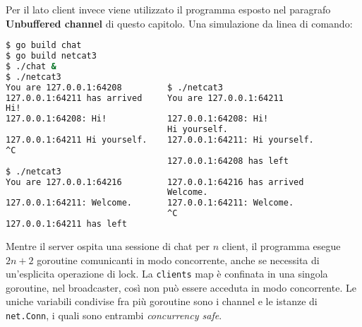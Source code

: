 Per il lato client invece viene utilizzato il programma esposto nel paragrafo \textbf{Unbuffered channel} di questo capitolo.
Una simulazione da linea di comando:
\begin{lstlisting}[language=bash, frame=L, label={lst:lstlisting7-10.4}]
$ go build chat
$ go build netcat3
$ ./chat &
$ ./netcat3
You are 127.0.0.1:64208         $ ./netcat3
127.0.0.1:64211 has arrived     You are 127.0.0.1:64211
Hi!
127.0.0.1:64208: Hi!            127.0.0.1:64208: Hi!
                                Hi yourself.
127.0.0.1:64211 Hi yourself.    127.0.0.1:64211: Hi yourself.
^C
                                127.0.0.1:64208 has left
$ ./netcat3
You are 127.0.0.1:64216         127.0.0.1:64216 has arrived
                                Welcome.
127.0.0.1:64211: Welcome.       127.0.0.1:64211: Welcome.
                                ^C
127.0.0.1:64211 has left
\end{lstlisting}
Mentre il server ospita una sessione di chat per $n$ client, il programma esegue $2n+2$ goroutine comunicanti in modo concorrente, anche se necessita di un'esplicita operazione di lock.
La \verb|clients| map è confinata in una singola goroutine, nel broadcaster, così non può essere acceduta in modo concorrente.
Le uniche variabili condivise fra più goroutine sono i channel e le istanze di \verb|net.Conn|, i quali sono entrambi \textit{concurrency safe}.